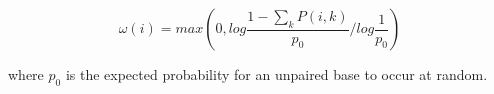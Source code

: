 \documentclass[a4paper,11pt]{article}
\begin{document}
\begin{equation}\label{eq12}
	\omega(i) = max \left( 0, log \frac{1 - \sum_k P(i,k)}{p_0} / log \frac{1}{p_0} \right)
\end{equation}

\noindent  where $p_0$ is the expected probability for an unpaired base to occur at
random.



\end{document}
